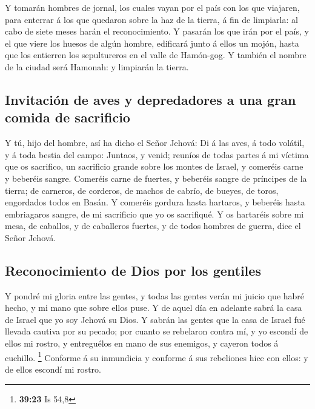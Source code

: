  Y tomarán hombres de jornal, los cuales vayan por el
país con los que viajaren, para enterrar á los que quedaron sobre la haz
de la tierra, á fin de limpiarla: al cabo de siete meses harán el
reconocimiento.  Y pasarán los que irán por el país, y el
que viere los huesos de algún hombre, edificará junto á ellos un mojón,
hasta que los entierren los sepultureros en el valle de Hamón-gog.
 Y también el nombre de la ciudad será Hamonah: y
limpiarán la tierra.

\hypertarget{invitaciuxf3n-de-aves-y-depredadores-a-una-gran-comida-de-sacrificio}{%
\subsection{Invitación de aves y depredadores a una gran comida de
sacrificio}\label{invitaciuxf3n-de-aves-y-depredadores-a-una-gran-comida-de-sacrificio}}

 Y tú, hijo del hombre, así ha dicho el Señor Jehová: Di
á las aves, á todo volátil, y á toda bestia del campo: Juntaos, y venid;
reuníos de todas partes á mi víctima que os sacrifico, un sacrificio
grande sobre los montes de Israel, y comeréis carne y beberéis sangre.
 Comeréis carne de fuertes, y beberéis sangre de
príncipes de la tierra; de carneros, de corderos, de machos de cabrío,
de bueyes, de toros, engordados todos en Basán.  Y
comeréis gordura hasta hartaros, y beberéis hasta embriagaros sangre, de
mi sacrificio que yo os sacrifiqué.  Y os hartaréis sobre
mi mesa, de caballos, y de caballeros fuertes, y de todos hombres de
guerra, dice el Señor Jehová.

\hypertarget{reconocimiento-de-dios-por-los-gentiles}{%
\subsection{Reconocimiento de Dios por los
gentiles}\label{reconocimiento-de-dios-por-los-gentiles}}

 Y pondré mi gloria entre las gentes, y todas las gentes
verán mi juicio que habré hecho, y mi mano que sobre ellos puse.
 Y de aquel día en adelante sabrá la casa de Israel que
yo soy Jehová su Dios.  Y sabrán las gentes que la casa
de Israel fué llevada cautiva por su pecado; por cuanto se rebelaron
contra mí, y yo escondí de ellos mi rostro, y entreguélos en mano de sus
enemigos, y cayeron todos á cuchillo. \footnote{\textbf{39:23} Is 54,8}
 Conforme á su inmundicia y conforme á sus rebeliones
hice con ellos: y de ellos escondí mi rostro.

